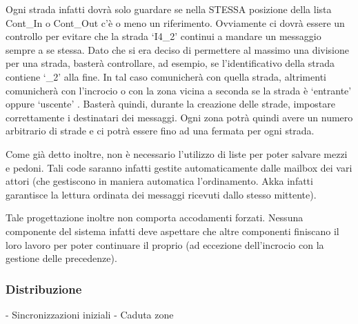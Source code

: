 \documentclass{article}
\begin{document}
Ogni strada infatti dovr\`{a} solo guardare se nella STESSA posizione della lista Cont\_In o Cont\_Out c\textquoteright{}\`{e} o meno un riferimento. Ovviamente ci dovr\`{a} essere un controllo per evitare che la strada \lq I4\_2\rq{} continui a mandare un messaggio sempre a se stessa. Dato che si era deciso di permettere al massimo una divisione per una strada, baster\`{a} controllare, ad esempio, se l\textquoteright{}identificativo della strada contiene \lq \_2\rq{}  alla fine. In tal caso comunicher\`{a} con quella strada, altrimenti comunicher\`{a} con l\textquoteright{}incrocio o con la zona vicina a seconda se la strada \`{e} \lq entrante\rq{} oppure \lq uscente\rq{} . Baster\`{a} quindi, durante la creazione delle strade, impostare correttamente i destinatari dei messaggi. Ogni zona potr\`{a} quindi avere un numero arbitrario di strade e ci potr\`{a} essere fino ad una fermata per ogni strada.
\par Come gi\`{a} detto inoltre, non \`{e} necessario l\textquoteright{}utilizzo di liste per poter salvare mezzi e pedoni. Tali code saranno infatti gestite automaticamente dalle mailbox dei vari attori (che gestiscono in maniera automatica l\textquoteright{}ordinamento. Akka infatti garantisce la lettura ordinata dei messaggi ricevuti dallo stesso mittente). 
\par Tale progettazione inoltre non comporta accodamenti forzati. Nessuna componente del sistema infatti deve aspettare che altre componenti finiscano il loro lavoro per poter continuare il proprio (ad eccezione dell\textquoteright{}incrocio con la gestione delle precedenze). 


\subsubsection{Distribuzione}
- Sincronizzazioni iniziali \newline
- Caduta zone \newline
\end{document}
